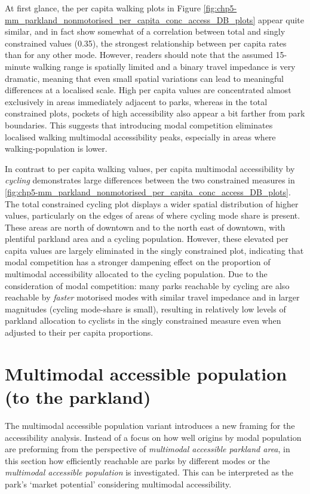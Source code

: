 \documentclass[
11pt, %
oneside, %
english, %
singlespacing, %
]{macthesis} %
\begin{document}
At first glance, the per capita walking plots in
Figure \ref{fig:chp5-mm_parkland_nonmotorised_per_capita_conc_access_DB_plots} appear
quite similar, and in fact show somewhat of a correlation between total and singly constrained values (0.35), the strongest relationship between per capita rates than for any other mode. However, readers should note that the assumed 15-minute walking range is spatially limited and a binary travel impedance is very dramatic, meaning that even small spatial variations can lead to meaningful differences at a localised scale. High per capita values are concentrated almost exclusively in areas immediately adjacent to parks, whereas in the total constrained plots, pockets of high accessibility also appear a bit farther from park boundaries. This suggests that introducing modal competition eliminates localised walking multimodal accessibility peaks, especially in areas where walking-population is lower.

In contrast to per capita walking values, per capita multimodal accessibility by \emph{cycling} demonstrates large differences between the two constrained measures in \ref{fig:chp5-mm_parkland_nonmotorised_per_capita_conc_access_DB_plots}. The total constrained cycling plot displays a wider spatial distribution of higher values, particularly on the edges of areas of where cycling mode share is present. These areas are north of downtown and to the north east of downtown, with plentiful parkland area and a cycling population. However, these elevated per capita values are largely eliminated in the singly constrained plot, indicating that modal competition has a stronger dampening effect on the proportion of multimodal accessibility allocated to the cycling population. Due to the consideration of modal competition: many parks reachable by cycling are also reachable by \emph{faster} motorised modes with similar travel impedance and in larger magnitudes (cycling mode-share is small), resulting in relatively low levels of parkland allocation to cyclists in the singly constrained measure even when adjusted to their per capita proportions.

\section{Multimodal accessible population (to the parkland)}\label{multimodal-accessible-population-to-the-parkland}

The multimodal accessible population variant introduces a new framing for the accessibility analysis. Instead of a focus on how well origins by modal population are preforming from the perspective of \emph{multimodal accessible parkland area}, in this section how efficiently reachable are parks by different modes or the \emph{multimodal accessible population} is investigated. This can be interpreted as the park's `market potential' considering multimodal accessibility.
\end{document}
